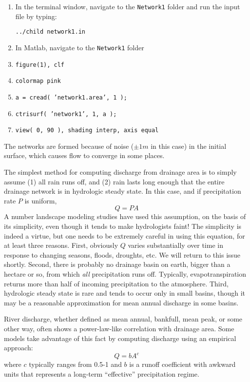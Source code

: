 \documentclass[12pt]{amsart}
\begin{document}
{\em
\begin{enumerate}
\item
In the terminal window, navigate to the {\tt Network1} folder and run the input file by typing:

{\tt ../child network1.in}
\item
In Matlab, navigate to the {\tt Network1} folder
\item
{\tt figure(1), clf}
\item
{\tt colormap pink}
\item
{\tt a = cread( 'network1.area', 1 );}
\item
{\tt ctrisurf( 'network1', 1, a );}
\item
{\tt view( 0, 90 ), shading interp, axis equal}
\end{enumerate}

The networks are formed because of noise ($\pm1m$ in this case) in the initial surface, which causes flow to converge in some places.
}

\medskip

The simplest method for computing discharge from drainage area is to simply assume (1) all rain runs off, and (2) rain lasts long enough that the entire drainage network is in hydrologic steady state. In this case, and if precipitation rate $P$ is uniform,
\begin{equation}
Q = PA
\end{equation}
A number landscape modeling studies have used this assumption, on the basis of its simplicity, even though it tends to make hydrologists faint! The simplicity is indeed a virtue, but one needs to be extremely careful in using this equation, for at least three reasons. First, obviously $Q$ varies substantially over time in response to changing seasons, floods, droughts, etc. We will return to this issue shortly. Second, there is probably no drainage basin on earth, bigger than a hectare or so, from which {\em all} precipitation runs off. Typically, evapotranspiration returns more than half of incoming precipitation to the atmosphere. Third, hydrologic steady state is rare and tends to occur only in small basins, though it may be a reasonable approximation for mean annual discharge in some basins.

River discharge, whether defined as mean annual, bankfull, mean peak, or some other way, often shows a power-law-like correlation with drainage area. Some models take advantage of this fact by computing discharge using an empirical approach:
\begin{equation}
Q = b A^c
\end{equation}
where $c$ typically ranges from 0.5-1 and $b$ is a runoff coefficient with awkward units that represents a long-term ``effective'' precipitation regime.
\end{document}
